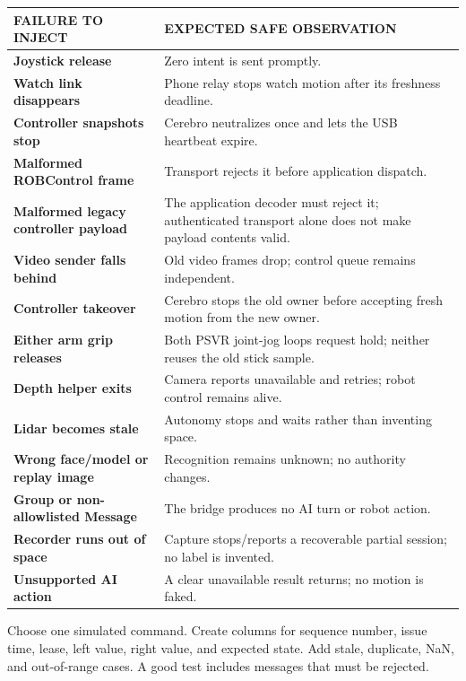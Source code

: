 \documentclass[11pt,openany]{book}
\begin{document}
\begin{tabularx}{\textwidth}{>{\robcondensed\bfseries\color{ROBAccent}}p{1.35in} X}
\toprule
FAILURE TO INJECT & EXPECTED SAFE OBSERVATION\\
\midrule
Joystick release & Zero intent is sent promptly.\\
Watch link disappears & Phone relay stops watch motion after its freshness deadline.\\
Controller snapshots stop & Cerebro neutralizes once and lets the USB heartbeat expire.\\
Malformed ROBControl frame & Transport rejects it before application dispatch.\\
Malformed legacy controller payload & The application decoder must reject it; authenticated transport alone does not make payload contents valid.\\
Video sender falls behind & Old video frames drop; control queue remains independent.\\
Controller takeover & Cerebro stops the old owner before accepting fresh motion from the new owner.\\
Either arm grip releases & Both PSVR joint-jog loops request hold; neither reuses the old stick sample.\\
Depth helper exits & Camera reports unavailable and retries; robot control remains alive.\\
Lidar becomes stale & Autonomy stops and waits rather than inventing space.\\
Wrong face/model or replay image & Recognition remains unknown; no authority changes.\\
Group or non-allowlisted Message & The bridge produces no AI turn or robot action.\\
Recorder runs out of space & Capture stops/reports a recoverable partial session; no label is invented.\\
Unsupported AI action & A clear unavailable result returns; no motion is faked.\\
\bottomrule
\end{tabularx}


\begin{buildbox}[title={WRITE A TEST TABLE}]
Choose one simulated command. Create columns for sequence number, issue time, lease, left value, right value, and expected state. Add stale, duplicate, NaN, and out-of-range cases. A good test includes messages that must be rejected.
\end{buildbox}
\end{document}
